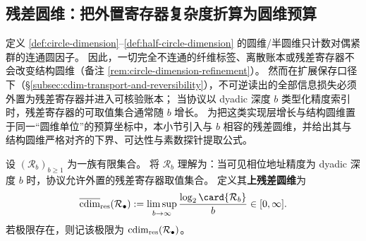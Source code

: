 \subsection{残差圆维：把外置寄存器复杂度折算为圆维预算}\label{subsec:cdim-residual-circle-dimension}
定义 \ref{def:circle-dimension}--\ref{def:half-circle-dimension} 的圆维/半圆维只计数对偶紧群的连通圆因子。
因此，一切完全不连通的纤维标签、离散账本或残差寄存器不会改变结构圆维（备注 \ref{rem:circle-dimension-refinement}）。
然而在扩展保存口径下（\S\ref{subsec:cdim-transport-and-reversibility}），不可逆读出的全部信息损失必须外置为残差寄存器并进入可核验账本；
当协议以 dyadic 深度 \(b\) 类型化精度索引时，残差寄存器的可取值集合通常随 \(b\) 增长。
为把这类实现层增长与结构圆维置于同一“圆维单位”的预算坐标中，本小节引入与 \(b\) 相容的残差圆维，并给出其与结构圆维严格对齐的下界、可达性与素数探针提取公式。

\begin{definition}[残差圆维]\label{def:cdim-residual-circle-dimension}
设 \((\mathcal{R}_b)_{b\ge 1}\) 为一族有限集合。
将 \(\mathcal{R}_b\) 理解为：当可见相位地址精度为 dyadic 深度 \(b\) 时，协议允许外置的残差寄存器取值集合。
定义其\textbf{上残差圆维}为
\[
\overline{\cdim}_{\mathrm{res}}(\mathcal{R}_\bullet)
:=\limsup_{b\to\infty}\frac{\log_2\card{\mathcal{R}_b}}{b}\in[0,\infty].
\]
若极限存在，则记该极限为 \(\operatorname{cdim}_{\mathrm{res}}(\mathcal{R}_\bullet)\)。
\end{definition}


